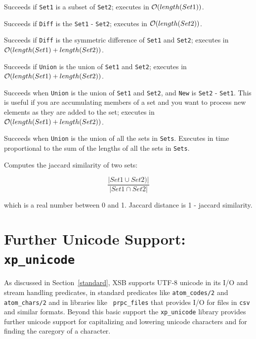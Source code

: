 \begin{description}
%
Succeeds if {\tt Set1} is a subset of {\tt Set2}; executes in
${\cal O}(length(Set1))$.

%
Succeeds if {\tt Diff} is the {\tt Set1} - {\tt Set2}; executes in
${\cal O}(length(Set2))$.

%
Succeeds if {\tt Diff} is the symmetric difference of {\tt Set1} and
{\tt Set2}; executes in ${\cal O}(length(Set1) + length(Set2))$.

%
Succeeds if {\tt Union} is the union of {\tt Set1} and {\tt Set2}; executes in
${\cal O}(length(Set1)+length(Set2))$.

%
Succeeds when {\tt Union} is the union of {\tt Set1} and {\tt Set2},
and {\tt New} is {\tt Set2} - {\tt Set1}.  This is useful if you are
accumulating members of a set and you want to process new elements as
they are added to the set; executes in ${\cal O}(length(Set1) + length(Set2))$.

%
Succeeds when {\tt Union} is the union of all the sets in {\tt Sets}. 
Executes in time proportional to the sum of the lengths
of all the sets in {\tt Sets}.

%
Computes the jaccard similarity of two sets:

\[ \frac{|Set1 \cup Set2)|}{|Set1 \cap Set2|}\]

which is a real number between 0 and 1.  Jaccard distance is 1 -
jaccard similarity.
\end{description}

\section{Further Unicode Support: {\tt xp\_unicode}}

As discussed in Section~\ref{standard}, XSB supports UTF-8 unicode in
its I/O and stream handling predicates, in standard predicates like
{\tt atom\_codes/2} and {\tt atom\_chars/2} and in libraries like {\tt
  prpc\_files} that provides I/O for files in {\tt csv} and similar
formats.  Beyond this basic support the {\tt xp\_unicode} library
provides further unicode support for capitalizing and lowering unicode
characters and for finding the caregory of a character.


